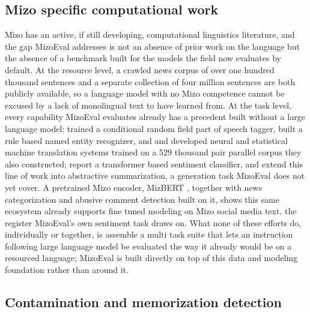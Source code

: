 \documentclass[11pt,a4paper]{article}
\begin{document}
\subsection{Mizo specific computational work}
\label{sec:mizo-compute}

Mizo has an active, if still developing, computational linguistics literature, and the gap MizoEval addresses is not an absence of prior work on the language but the absence of a benchmark built for the models the field now evaluates by default. At the resource level, a crawled news corpus of over one hundred thousand sentences \citep{lalrempuii2023lus} and a separate collection of four million sentences \citep{mwirelabs2024corpus} are both publicly available, so a language model with no Mizo competence cannot be excused by a lack of monolingual text to have learned from. At the task level, every capability MizoEval evaluates already has a precedent built without a large language model: \citet{nunsanga2021postagging} trained a conditional random field part of speech tagger, \citet{bentham2016ner} built a rule based named entity recognizer, and \citet{pathak2019mizonmt} and \citet{thangkhanhau2023parallelcorpus} developed neural and statistical machine translation systems trained on a 529 thousand pair parallel corpus they also constructed; \citet{lalthangmawii2025sentiment} report a transformer based sentiment classifier, and \citet{bala2024summarization} extend this line of work into abstractive summarization, a generation task MizoEval does not yet cover. A pretrained Mizo encoder, MizBERT \citep{lalramhluna2024mizbert}, together with news categorization \citep{lalramhluna2023newsclassificationa,lalramhluna2023newsclassificationb} and abusive comment detection \citep{lalrinmawii2025abusive} built on it, shows this same ecosystem already supports fine tuned modeling on Mizo social media text, the register MizoEval's own sentiment task draws on. What none of these efforts do, individually or together, is assemble a multi task suite that lets an instruction following large language model be evaluated the way it already would be on a resourced language; MizoEval is built directly on top of this data and modeling foundation rather than around it.

\subsection{Contamination and memorization detection}
\end{document}
